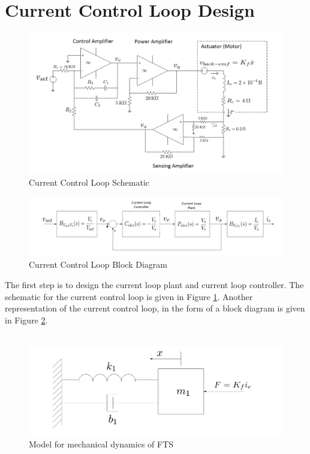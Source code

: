\documentclass[a4paper, titlepage, 12pt]{article}
\begin{document}
	\section{Current Control Loop Design}
		\begin{figure}
			\centering
			\includegraphics[width=\linewidth]{images/current_loop_schematic.PNG}
			\caption{Current Control Loop Schematic}
			\label{current_loop_schematic}
		\end{figure}
		\begin{figure}
			\centering
			\includegraphics[width=\linewidth]{images/current_loop_block.PNG}
			\caption{Current Control Loop Block Diagram}
			\label{current_loop_block}
		\end{figure}
		The first step is to design the current loop plant and current loop
		controller. The schematic for the current control loop is given in Figure
		\ref{current_loop_schematic}. Another representation of the current
		control loop, in the form of a block diagram is given in Figure
		\ref{current_loop_block}. \\\\
		\begin{figure}
			\centering
			\includegraphics[width=\linewidth]{images/mechanical_model.PNG}
			\caption{Model for mechanical dynamics of FTS}
			\label{mechanical_model}
		\end{figure}
\end{document}

